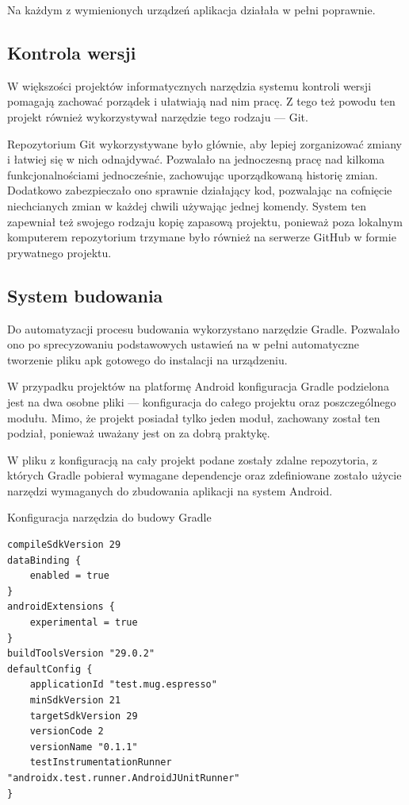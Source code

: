 \documentclass[polish,polish,a4paper,12pt]{article}
\begin{document}
	Na każdym z wymienionych urządzeń aplikacja działała w pełni poprawnie.

	\subsection{Kontrola wersji}

	W większości projektów informatycznych narzędzia systemu kontroli wersji pomagają zachować porządek i ułatwiają nad nim pracę. Z tego też powodu ten projekt również wykorzystywał narzędzie tego rodzaju — Git.

	Repozytorium Git wykorzystywane było głównie, aby lepiej zorganizować zmiany i łatwiej się w nich odnajdywać. Pozwalało na jednoczesną pracę nad kilkoma funkcjonalnościami jednocześnie, zachowując uporządkowaną historię zmian. Dodatkowo zabezpieczało ono sprawnie działający kod, pozwalając na cofnięcie niechcianych zmian w każdej chwili używając jednej komendy. System ten zapewniał też swojego rodzaju kopię zapasową projektu, ponieważ poza lokalnym komputerem repozytorium trzymane było również na serwerze GitHub w formie prywatnego projektu.

	\subsection{System budowania}

	Do automatyzacji procesu budowania wykorzystano narzędzie Gradle. Pozwalało ono po sprecyzowaniu podstawowych ustawień na w pełni automatyczne tworzenie pliku apk gotowego do instalacji na urządzeniu.

	W przypadku projektów na platformę Android konfiguracja Gradle podzielona jest na dwa osobne pliki — konfiguracja do całego projektu oraz poszczególnego modułu. Mimo, że projekt posiadał tylko jeden moduł, zachowany został ten podział, ponieważ uważany jest on za dobrą praktykę.

	W pliku z konfiguracją na cały projekt podane zostały zdalne repozytoria, z których Gradle pobierał wymagane dependencje oraz zdefiniowane zostało użycie narzędzi wymaganych do zbudowania aplikacji na system Android.

	\begin{listing}[H]
		\caption{Konfiguracja narzędzia do budowy Gradle}
		\begin{verbatim}
compileSdkVersion 29
dataBinding {
	enabled = true
}
androidExtensions {
	experimental = true
}
buildToolsVersion "29.0.2"
defaultConfig {
	applicationId "test.mug.espresso"
	minSdkVersion 21
	targetSdkVersion 29
	versionCode 2
	versionName "0.1.1"
	testInstrumentationRunner "androidx.test.runner.AndroidJUnitRunner"
}
		\end{verbatim}
		\label{listing:gradle}
	\end{listing}
\end{document}
